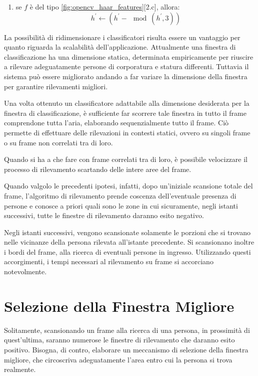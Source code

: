 \begin{enumerate}
\begin{enumerate}
\begin{enumerate}
                    \item se $f$ è del tipo \ref{fig:opencv_haar_features}[2.c], allora:
                    \begin{equation}
                        h^{'} \leftarrow (h^{'} - \mod(h^{'}, 3))
                    \end{equation}
                \end{enumerate}
             \end{enumerate} 
        \end{enumerate}

        La possibilità di ridimensionare i classificatori risulta essere un vantaggio per quanto riguarda la scalabilità dell'applicazione.
        Attualmente una finestra di classificazione ha una dimensione statica, determinata empiricamente per riuscire a rilevare adeguatamente persone di corporatura e statura differenti.
        Tuttavia il sistema può essere migliorato andando a far variare la dimensione della finestra per garantire rilevamenti migliori.

        Una volta ottenuto un classificatore adattabile alla dimensione desiderata per la finestra di classificazione, è sufficiente far scorrere tale finestra in tutto il frame comprendone tutta l'aria, elaborando sequenzialmente tutto il frame.
        Ciò permette di effettuare delle rilevazioni in contesti statici, ovvero su singoli frame o su frame non correlati tra di loro.

        Quando si ha a che fare con frame correlati tra di loro, è possibile velocizzare il processo di rilevamento scartando delle intere aree del frame.

        Quando valgolo le precedenti ipotesi, infatti, dopo un'iniziale scansione totale del frame, l'algoritmo di rilevamento prende coscenza dell'eventuale presenza di persone e conosce a priori quali sono le zone in cui sicuramente, negli istanti successivi, tutte le finestre di rilevamento daranno esito negativo.

        Negli istanti successivi, vengono scansionate solamente le porzioni che si trovano nelle vicinanze della persona rilevata all'istante precedente.
        Si scansionano inoltre i bordi del frame, alla ricerca di eventuali persone in ingresso.
        Utilizzando questi accorgimenti, i tempi necessari al rilevamento su frame si accorciano notevolmente.


    \section{Selezione della Finestra Migliore} %
    \label{sec:best_detection_window}
        Solitamente, scansionando un frame alla ricerca di una persona, in prossimità di quest'ultima, saranno numerose le finestre di rilevamento che daranno esito positivo.
        Bisogna, di contro, elaborare un meccanismo di selezione della finestra migliore, che circoscriva adeguatamente l'area entro cui la persona si trova realmente.

